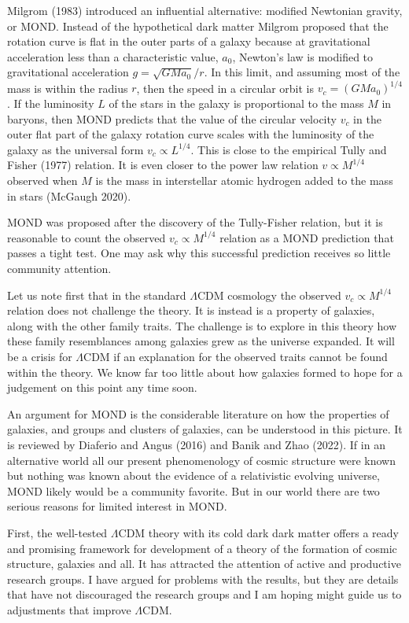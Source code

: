 \documentclass[fleqn,12pt]{article}
\begin{document}
Milgrom (1983) introduced an influential alternative: modified Newtonian gravity, or MOND. Instead of the hypothetical dark matter Milgrom proposed that the rotation curve is flat in the outer parts of a galaxy because at gravitational acceleration less than a characteristic value, $a_0$, Newton's law is modified to gravitational acceleration $g = \sqrt{GMa_0}/r$. In this limit, and assuming most of the mass is within the radius $r$, then the speed in a circular orbit is $v_c=(GMa_0)^{1/4}$. If the luminosity $L$ of the stars in the galaxy is proportional to the mass $M$ in baryons, then MOND predicts that the value of the circular velocity $v_c$ in the outer flat part of the galaxy rotation curve scales with the luminosity of the galaxy as the universal form $v_c\propto L^{1/4}$. This is close to the empirical Tully and Fisher (1977) relation. It is even closer to the power law relation $v\propto M^{1/4}$ observed when $M$ is the mass in interstellar atomic hydrogen added to the mass in stars (McGaugh 2020). 

MOND was proposed after the discovery of the Tully-Fisher relation, but it is reasonable to count the observed $v_c\propto M^{1/4}$ relation as a MOND prediction that passes a tight test. One may ask why this successful prediction receives so little community attention.

Let us note first that in the standard $\Lambda$CDM cosmology the observed $v_c\propto M^{1/4}$ relation does not challenge the theory.  It is instead is a property of galaxies, along with the other family traits. The challenge is to explore in this theory how these family resemblances among galaxies grew as the universe expanded. It will be a crisis for $\Lambda$CDM if an explanation for the observed traits cannot be found within the theory. We know far too little about how galaxies formed to hope for a judgement on this point any time soon. 

An argument for MOND is the considerable literature on how the properties of galaxies, and groups and clusters of galaxies, can be understood in this picture. It is reviewed by Diaferio and Angus (2016) and Banik and Zhao (2022). If in an alternative world all our present  phenomenology of cosmic structure were known but nothing was known about the evidence of a relativistic evolving universe, MOND likely would be a community favorite. But in our world there are two serious reasons for limited interest in MOND.

First, the well-tested $\Lambda$CDM theory with its cold dark dark matter offers a ready and promising framework for development of a theory of the formation of cosmic structure, galaxies and all. It has attracted the attention of active and productive research groups. I have argued for problems with the results, but they are details that have not discouraged the research groups and I am hoping might guide us to adjustments that improve $\Lambda$CDM.
\end{document}
